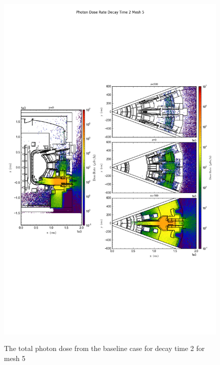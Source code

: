 \begin{figure}[ht!]
\centering
\includegraphics[trim={0cm 9cm 0cm 10cm},clip,scale=0.75]{../plots/final_model/Photon_Dose_Rate_Decay_Time_2_Mesh_5.png}
\label{fig:photons_dc2_no4bc_m5_flux}
\caption{The total photon dose from the baseline case for decay time 2 for mesh 5}
\end{figure}
